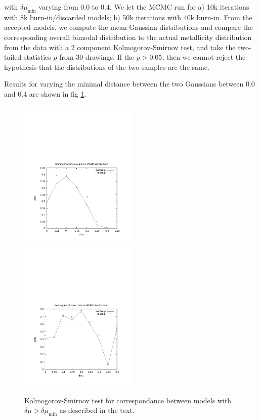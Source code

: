 with $\delta\mu_{\min}$ varying from $0.0$ to $0.4$. We let the MCMC
run for a) 10k iterations with 8k burn-in/discarded models; b) 50k
iterations with 40k burn-in. From the accepted models, we compute the
mean Gaussian distributions and compare the corresponding overall
bimodal distribution to the actual metallicity distribution from the
data with a 2 component Kolmogorov-Smirnov test, and take the
two-tailed statistics $p$ from 30 drawings. If the $p>0.05$, then we
cannot reject the hypothesis that the distributions of the two samples
are the same.

Results for varying the minimal distance between the two Gaussians
between $0.0$ and $0.4$ are shown in fig \ref{fig:kit}.

\begin{figure}
\begin{center}
\hspace{-7mm}
\includegraphics[width=0.5\textwidth]{fig/10kit.pdf}
\includegraphics[width=0.5\textwidth]{fig/50kit.pdf}
\caption{Kolmogorov-Smirnov test for correspondance between models
  with $\delta\mu>\delta\mu_{\min}$ as described in the text.}
\label{fig:kit}
\end{center}
\end{figure}


